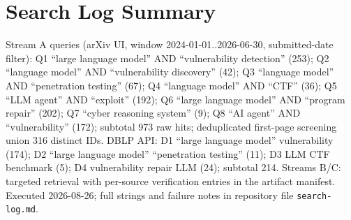 \section{Search Log Summary}
\label{app:search}
Stream A queries (arXiv UI, window 2024-01-01..2026-06-30, submitted-date filter):
Q1 ``large language model'' AND ``vulnerability detection'' (253); Q2 ``language model'' AND
``vulnerability discovery'' (42); Q3 ``language model'' AND ``penetration testing'' (67);
Q4 ``language model'' AND ``CTF'' (36); Q5 ``LLM agent'' AND ``exploit'' (192);
Q6 ``large language model'' AND ``program repair'' (202); Q7 ``cyber reasoning system'' (9);
Q8 ``AI agent'' AND ``vulnerability'' (172); subtotal 973 raw hits; deduplicated first-page
screening union 316 distinct IDs. DBLP API: D1 ``large language model'' vulnerability (174);
D2 ``large language model'' ``penetration testing'' (11); D3 LLM CTF benchmark (5);
D4 vulnerability repair LLM (24); subtotal 214. Streams B/C: targeted retrieval with per-source
verification entries in the artifact manifest. Executed 2026-08-26; full strings and failure
notes in repository file \texttt{search-log.md}.
